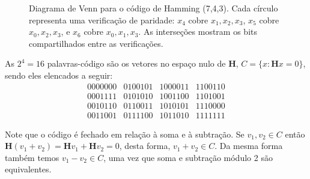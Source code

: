 \begin{figure}[h]
    \centering
    \caption{Diagrama de Venn para o código de Hamming (7,4,3). 
    Cada círculo representa uma verificação de paridade: 
    $x_4$ cobre $x_1, x_2, x_3$, $x_5$ cobre $x_0, x_2, x_3$, e 
    $x_6$ cobre $x_0, x_1, x_3$. 
    As interseções mostram os bits compartilhados entre as verificações.}
    \label{fig:hamming_venn}
\end{figure}

As $2^4 = 16$ palavras-código são os vetores no espaço nulo de $\mathbf{H}$,
$C = \{x : \mathbf{H} x = 0 \}$, sendo eles elencados a seguir:
        \begin{equation}
        \begin{matrix}
        0000000 & 0100101 & 1000011 & 1100110 \\
        0001111 & 0101010 & 1001100 & 1101001 \\
        0010110 & 0110011 & 1010101 & 1110000 \\
        0011001 & 0111100 & 1011010 & 1111111
        \end{matrix} 
        \end{equation}

Note que o código é fechado em relação à soma e à subtração.
Se $v_1, v_2 \in C$ então $\mathbf{H} (v_1 + v_2) = \mathbf{H} v_1 + \mathbf{H} v_2 = 0$, desta forma, $v_1 + v_2 \in C$. 
Da mesma forma também temos $v_1 - v_2 \in C$, uma vez que soma e subtração
módulo 2 são equivalentes.

